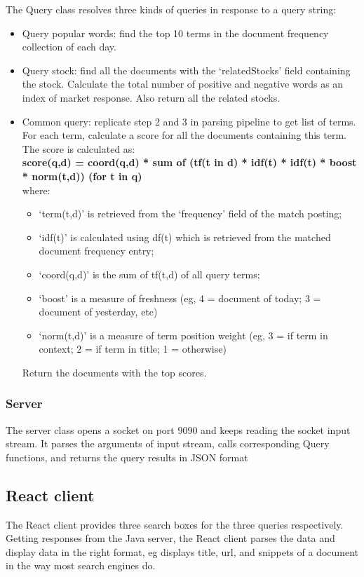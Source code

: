 \documentclass{article}
\begin{document}
The Query class resolves three kinds of queries in response to a query string: 
\begin{itemize}
  \item Query popular words: find the top 10 terms in the document frequency collection of each day. 
  \item Query stock: find all the documents with the `relatedStocks' field containing the stock. Calculate the total number of positive and negative words as an index of market response. Also return all the related stocks.
  \item Common query: replicate step 2 and 3 in parsing pipeline to get list of terms. For each term, calculate a score for all the documents containing this term. The score is calculated as:\\
  \textbf{score(q,d) = coord(q,d) * sum of (tf(t in d) * idf(t) * idf(t) * boost * norm(t,d)) (for t in q)} \\
  where:
  \begin{itemize}
    \item `term(t,d)' is retrieved from the `frequency' field of the match posting; 
    \item `idf(t)' is calculated using df(t) which is retrieved from the matched document frequency entry; 
    \item `coord(q,d)' is the sum of tf(t,d) of all query terms; 
    \item `boost' is a measure of freshness (eg, 4 = document of today; 3 = document of yesterday, etc)
    \item `norm(t,d)' is a measure of term position weight (eg, 3 = if term in context; 2 = if term in title; 1 = otherwise)
  \end{itemize}
  Return the documents with the top scores.
\end{itemize}

\subsubsection{Server}
The server class opens a socket on port 9090 and keeps reading the socket input stream. It parses the arguments of input stream, calls corresponding Query functions, and returns the query results in JSON format

\subsection{React client}
The React client provides three search boxes for the three queries respectively. Getting responses from the Java server, the React client parses the data and display data in the right format, eg displays title, url, and snippets of a document in the way most search engines do.  
\end{document}

